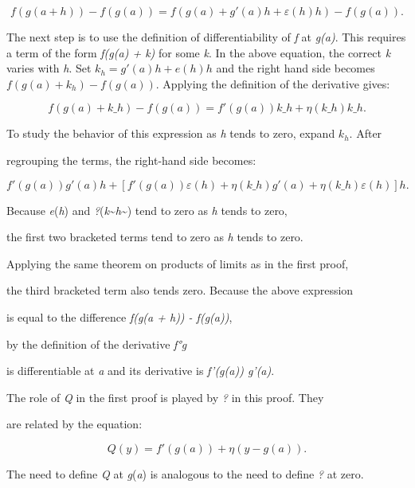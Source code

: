 {$$f(g(a + h)) - f(g(a)) = f(g(a) + g'(a) h + \varepsilon(h) h) - f(g(a)).$$



The next step is to use the definition of differentiability of \textit{f} at \textit{g(a)}. This requires a term of the form \textit{f(g(a) + k)} for some \textit{k}. In the above equation, the correct \textit{k} varies with \textit{h}. Set \textit{$k_h = g'(a) h + e(h) h$} and the right hand side becomes \textit{$f(g(a) + k_h) - f(g(a))$}. Applying the definition of the derivative gives:



$$f(g(a) + k\_h) - f(g(a)) = f'(g(a)) k\_h + \eta(k\_h) k\_h.$$



To study the behavior of this expression as \textit{h} tends to zero, expand \textit{$k_h$}. After

regrouping the terms, the right-hand side becomes:



$$f'(g(a)) g'(a)h + [f'(g(a)) \varepsilon(h) + \eta(k\_h) g'(a) + \eta(k\_h) \varepsilon(h)] h.$$



Because \textit{e}(\textit{h}) and \textit{?}(\textit{k}\textasciitilde{}\textit{h}\textasciitilde{}) tend to zero as \textit{h} tends to zero,

the first two bracketed terms tend to zero as \textit{h} tends to zero.

Applying the same theorem on products of limits as in the first proof,

the third bracketed term also tends zero. Because the above expression

is equal to the difference \textit{f(g(a + h)) - f(g(a))},

by the definition of the derivative \textit{f°g}

is differentiable at \textit{a} and its derivative is \textit{f'(g(a)) g'(a)}.



The role of \textit{Q} in the first proof is played by \textit{?} in this proof. They

are related by the equation:



$$Q(y) = f'(g(a)) + \eta(y - g(a)).$$



The need to define \textit{Q} at \textit{g}(\textit{a}) is analogous to the need to define \textit{?} at zero.



}
